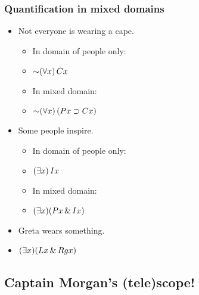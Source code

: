 \begin{frame}
\frametitle{Quantification in mixed domains}

\begin{itemize}[<+->]
\item Not everyone is wearing a cape.
\begin{itemize}
  \item In domain of people only:
  \item[] \alert{$\enot \qt{\forall}{x}\, C\qv{x}$}
  \item In mixed domain:
  \item[] \alert{$\enot \qt{\forall}{x}\, (P\qv{x} \eif C\qv{x})$}
\end{itemize}
\item Some people inspire.
\begin{itemize}[<+->]
  \item In domain of people only:
  \item[] \alert{$(\exists x)\,Ix$}
  \item In mixed domain:
  \item[] \alert{$(\exists x)(Px \,\&\, Ix)$}
\end{itemize}
\item Greta wears something.
\item[] \alert{$(\exists x)(Lx \,\&\, Rgx)$}
\end{itemize}
\end{frame}

\subsection{Captain Morgan's (tele)scope!}

